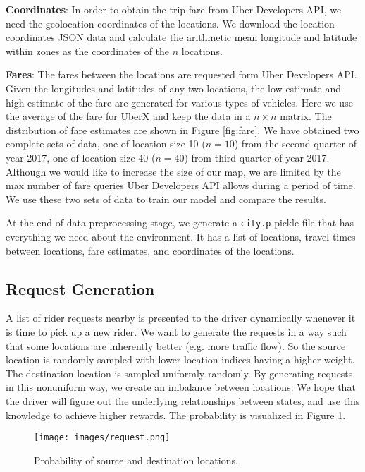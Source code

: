 \documentclass{article}
\begin{document}
\textbf{Coordinates}: In order to obtain the trip fare from Uber Developers API, we need the geolocation coordinates of the locations. We download the location-coordinates JSON data and calculate the arithmetic mean longitude and latitude within zones as the coordinates of the $n$ locations.

\textbf{Fares}: The fares between the locations are requested form Uber Developers API. Given the longitudes and latitudes of any two locations, the low estimate and high estimate of the fare are generated for various types of vehicles. Here we use the average of the fare for UberX and keep the data in a $n\times n$ matrix. The distribution of fare estimates are shown in Figure \ref{fig:fare}. We have obtained two complete sets of data, one of location size 10 ($n=10$) from the second quarter of year 2017, one of location size 40 ($n=40$) from third quarter of year 2017. Although we would like to increase the size of our map, we are limited by the max number of fare queries Uber Developers API allows during a period of time. We use these two sets of data to train our model and compare the results.

At the end of data preprocessing stage, we generate a \texttt{city.p} pickle file that has everything we need about the environment. It has a list of locations, travel times between locations, fare estimates, and coordinates of the locations.

\subsection{Request Generation}

A list of rider requests nearby is presented to the driver dynamically whenever it is time to pick up a new rider. We want to generate the requests in a way such that some locations are inherently better (e.g. more traffic flow). So the source location is randomly sampled with lower location indices having a higher weight. The destination location is sampled uniformly randomly. By generating requests in this nonuniform way, we create an imbalance between locations. We hope that the driver will figure out the underlying relationships between states, and use this knowledge to achieve higher rewards. The probability is visualized in Figure \ref{fig:generation}.

\begin{figure}[!htb]
\begin{center}
\texttt{[image: images/request.png]}
\end{center}
\caption{Probability of source and destination locations.}
\label{fig:generation}
\end{figure}
\end{document}
